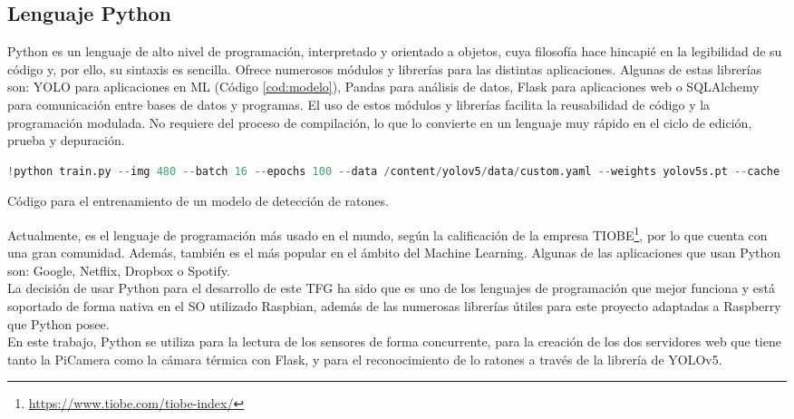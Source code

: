 \subsection{Lenguaje Python}
\label{sec:python}
Python es un lenguaje de alto nivel de programación, interpretado y orientado a objetos, cuya filosofía hace hincapié en la legibilidad de su código y, por ello, su sintaxis es sencilla. Ofrece numerosos módulos y librerías para las distintas aplicaciones. Algunas de estas librerías son: YOLO para aplicaciones en ML (Código \ref{cod:modelo}), Pandas para análisis de datos, Flask para aplicaciones web o SQLAlchemy para comunicación entre bases de datos y programas. El uso de estos módulos y librerías facilita la reusabilidad de código y la programación modulada. No requiere del proceso de compilación, lo que lo convierte en un lenguaje muy rápido en el ciclo de edición, prueba y depuración.\\
\begin{code}[h]
\begin{lstlisting}[language=Python]
!python train.py --img 480 --batch 16 --epochs 100 --data /content/yolov5/data/custom.yaml --weights yolov5s.pt --cache
\end{lstlisting}
\caption[Código para el entrenamiento de un modelo de detección de ratones.]{Código para el entrenamiento de un modelo de detección de ratones.}
\label{cod:modelo}
\end{code}

Actualmente, es el lenguaje de programación más usado en el mundo, según la calificación de la empresa TIOBE\footnote{\url{https://www.tiobe.com/tiobe-index/}}, por lo que cuenta con una gran comunidad. Además, también es el más popular en el ámbito del Machine Learning. Algunas de las aplicaciones que usan Python son: Google, Netflix, Dropbox o Spotify.\\

La decisión de usar Python para el desarrollo de este TFG ha sido que es uno de los lenguajes de programación que mejor funciona y está soportado de forma nativa en el SO utilizado Raspbian, además de las numerosas librerías útiles para este proyecto adaptadas a Raspberry que Python posee.\\

En este trabajo, Python se utiliza para la lectura de los sensores de forma concurrente, para la creación de los dos servidores web que tiene tanto la PiCamera como la cámara térmica con Flask, y para el reconocimiento de lo ratones a través de la librería de YOLOv5.\\

